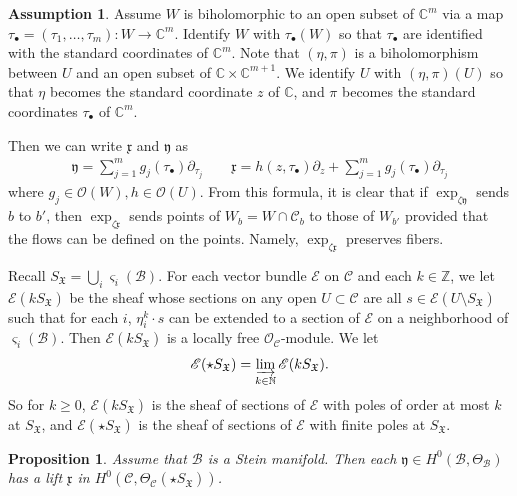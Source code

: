 \documentclass[12pt,a4paper,notitlepage]{article}
\theoremstyle{definition}
\newtheorem{ass}[df]{Assumption}
\theoremstyle{plain}
\newtheorem{pp}[df]{Proposition}
\newcommand{\fk}{\mathfrak}
\newcommand{\mc}{\mathcal}
\newcommand{\scr}{\mathscr}
\newcommand{\xk}{\mathfrak x}
\newcommand{\yk}{\mathfrak y}
\newcommand{\sgm}{\varsigma}
\newcommand{\SX}{{S_{\fk X}}}
\newcommand{\blt}{\bullet}
\newcommand{\Cbb}{\mathbb C}
\newcommand{\Nbb}{\mathbb N}
\newcommand{\Zbb}{\mathbb Z}
\numberwithin{equation}{section}
\begin{document}
\begin{ass}\label{lb113}
Assume $W$ is biholomorphic to an open subset of $\Cbb^m$ via a map $\tau_\blt=(\tau_1,\dots,\tau_m):W\rightarrow\Cbb^m$. Identify $W$ with $\tau_\blt(W)$ so that $\tau_\blt$ are identified with the standard coordinates of $\Cbb^m$. Note that $(\eta,\pi)$ is a biholomorphism between $U$ and an open subset of $\Cbb\times\Cbb^{m+1}$. We identify $U$ with $(\eta,\pi)(U)$ so that $\eta$ becomes the standard coordinate $z$ of $\Cbb$, and $\pi$ becomes the standard coordinates $\tau_\blt$ of $\Cbb^m$.
\end{ass}

Then we can write $\xk$ and $\yk$ as
\begin{subequations}
\begin{gather}
\yk=\sum_{j=1}^m g_j(\tau_\blt)\partial_{\tau_j}\qquad \xk=h(z,\tau_\blt)\partial_z+\sum_{j=1}^m g_j(\tau_\blt)\partial_{\tau_j}
\end{gather}
\end{subequations}
where $g_j\in\scr O(W),h\in\scr O(U)$. From this formula, it is clear that if $\exp_{\zeta\yk}$ sends $b$ to $b'$, then $\exp_{\zeta\xk}$ sends points of $W_b=W\cap\mc C_b$ to those of $W_{b'}$ provided that the flows can be defined on the points. Namely, $\exp_{\zeta\xk}$ preserves fibers.




Recall $\SX=\bigcup_i\sgm_i(\mc B)$. For each vector bundle $\scr E$ on $\mc C$ and each $k\in\Zbb$, we let $\scr E(k\SX)$ \index{ESX@$\scr E(k\SX),\scr E(\star\SX)$} be the sheaf whose sections on any open $U\subset\mc C$ are all $s\in\mc E(U\setminus\SX)$ such that for each $i$, $\eta_i^k\cdot s$ can be extended to a section of $\scr E$ on a neighborhood of $\sgm_i(\mc B)$. Then $\scr E(k\SX)$ is a locally free $\scr O_{\mc C}$-module. We let
\begin{align*}
\scr E(\star\SX)=\varinjlim_{k\in\Nbb}\scr E(k\SX).
\end{align*}
So for $k\geq0$, $\scr E(k\SX)$ is the sheaf of sections of $\scr E$ with poles of order at most $k$ at $\SX$, and  $\scr E(\star\SX)$ is the sheaf of sections of $\scr E$ with finite poles at $\SX$.




\begin{pp}\label{lb114}
Assume that $\mc B$ is a Stein manifold. Then each $\yk\in H^0(\mc B,\Theta_{\mc B})$ has a lift $\xk$ in $H^0(\mc C,\Theta_{\mc C}(\star\SX))$. 
\end{pp}
\end{document}
